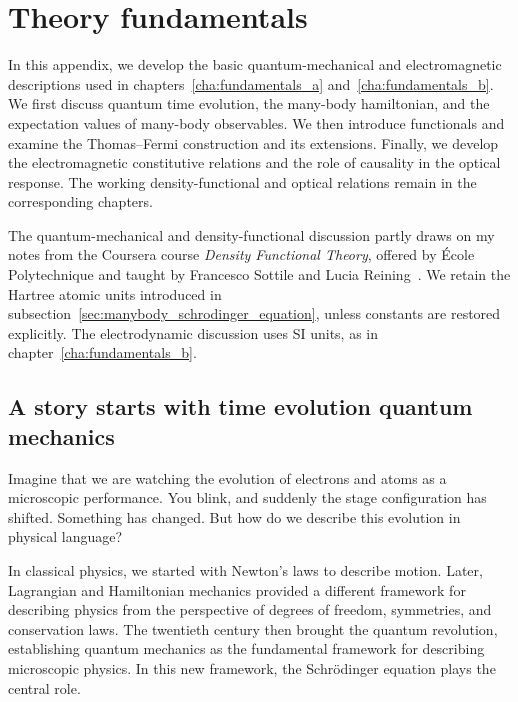 \chapter{Theory fundamentals}
\label{cha:appendix_basic}

In this appendix, we develop the basic quantum-mechanical and electromagnetic descriptions used in chapters~\ref{cha:fundamentals_a} and~\ref{cha:fundamentals_b}.
We first discuss quantum time evolution, the many-body hamiltonian, and the expectation values of many-body observables.
We then introduce functionals and examine the Thomas--Fermi construction and its extensions.
Finally, we develop the electromagnetic constitutive relations and the role of causality in the optical response.
The working density-functional and optical relations remain in the corresponding chapters.

The quantum-mechanical and density-functional discussion partly draws on my notes from the Coursera course \textit{Density Functional Theory}, offered by École Polytechnique and taught by Francesco Sottile and Lucia Reining~\cite{sottile_reining_dft_coursera}.
We retain the Hartree atomic units introduced in subsection~\ref{sec:manybody_schrodinger_equation}, unless constants are restored explicitly.
The electrodynamic discussion uses SI units, as in chapter~\ref{cha:fundamentals_b}.

\newpage
\section{A story starts with time evolution quantum mechanics}
\label{sec:time_evolution_quantum_mechanics}

Imagine that we are watching the evolution of electrons and atoms as a microscopic performance.
You blink, and suddenly the stage configuration has shifted.
Something has changed. But how do we describe this evolution in physical language?

In classical physics, we started with Newton's laws to describe motion.
Later, Lagrangian and Hamiltonian mechanics provided a different framework for describing physics from the perspective of degrees of freedom, symmetries, and conservation laws.
The twentieth century then brought the quantum revolution, establishing quantum mechanics as the fundamental framework for describing microscopic physics.
In this new framework, the Schrödinger equation plays the central role.

